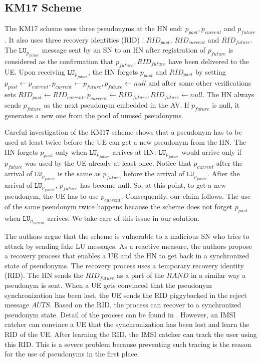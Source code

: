 \documentclass{llncs} %
\begin{document}
\subsection{KM17 Scheme} \label{sec:km17scheme}
The KM17 scheme uses three pseudonyms at the HN end: $p_{past},p_{current}$ and $p_{future}$. It also uses three recovery identities (RID) : $RID_{past}$, $RID_{current}$ and $RID_{future}$. The $\texttt{LU}_{p_{future}}$ message sent by an SN to an HN after registration of $p_{future}$ is considered as the confirmation that $p_{future}, RID_{future}$ have been delivered to the UE. Upon receiving $\texttt{LU}_{p_{future}}$, the HN forgets $p_{past}$ and $RID_{past}$ by setting $p_{past} \leftarrow p_{current}, p_{current} \leftarrow p_{future}, p_{future} \leftarrow null$ and after some other verifications sets $RID_{past} \leftarrow RID_{current}, p_{current} \leftarrow RID_{future}, RID_{future} \leftarrow null$. The HN always sends $p_{future}$ as the next pseudonym embedded in the AV. If $p_{future}$ is null, it generates a new one from the pool of unused pseudonyms.


Careful investigation of the KM17 scheme shows that a pseudonym has to be used at least twice before the UE can get a new pseudonym from the HN. The HN forgets $p_{past}$ only when $\texttt{LU}_{p_{future}}$ arrives at HN. $\texttt{LU}_{p_{future}}$ would arrive only if $p_{future}$ was used by the UE already at least once. Notice that $p_{current}$ after the arrival of $\texttt{LU}_{p_{future}}$ is the same as $p_{future}$ before the arrival of $\texttt{LU}_{p_{future}}$. After the arrival of $\texttt{LU}_{p_{future}}$, $p_{future}$ has become null. So, at this point, to get a new pseudonym, the UE has to use $p_{current}$. Consequently, our claim follows. The use of the same pseudonym twice happens because the scheme does not forget $p_{past}$ when $\texttt{LU}_{p_{current}}$ arrives. We take care of this issue in our solution.

The authors argue that the scheme is vulnerable to a malicious SN who tries to attack by sending fake LU messages. As a reactive measure, the authors propose a recovery process that enables a UE and the HN to get back in a synchronized state of pseudonyms. The recovery process uses a temporary recovery identity (RID). The HN sends the $RID_{future}$ as a part of the $RAND$ in a similar way a pseudonym is sent. When a UE gets convinced that the pseudonym synchronization has been lost, the UE sends the RID piggybacked in the reject message $AUTS$. Based on the RID, the process can recover to a synchronized pseudonym state. Detail of the process can be found in \cite{wisec17}. However, an IMSI catcher can convince a UE that the synchronization has been lost and learn the RID of the UE. After learning the RID, the IMSI catcher can track the user using this RID. This is a severe problem because preventing such tracing is the reason for the use of pseudonyms in the first place.
\end{document}
